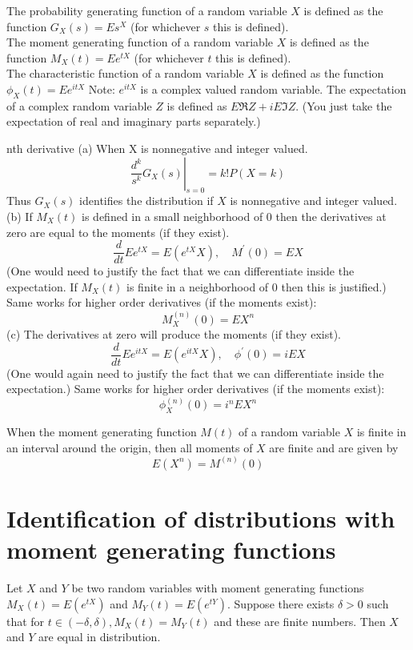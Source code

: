 \documentclass[11pt]{elegantbook}
\begin{document}
\begin{definition}
    The probability generating function of a random variable $X$ is defined as the function $G_X(s)=E s^X$ (for whichever $s$ this is defined).\\

The moment generating function of a random variable $X$ is defined as the function $M_X(t)=E e^{t X}$ (for whichever $t$ this is defined).\\

The characteristic function of a random variable $X$ is defined as the function $\phi_X(t)=E e^{i t X}$
Note: $e^{i t X}$ is a complex valued random variable. The expectation of a complex random variable $Z$ is defined as $E \Re Z+i E \Im Z$. (You just take the expectation of real and imaginary parts separately.)
\end{definition}
\begin{proposition}{nth derivative}
  (a) When X is nonnegative and integer valued.$$
\left.\frac{d^k}{s^k} G_X(s)\right|_{s=0}=k ! P(X=k)
$$
Thus $G_X(s)$ identifies the distribution if $X$ is nonnegative and integer valued.\\

(b)
If $M_X(t)$ is defined in a small neighborhood of 0 then the derivatives at zero are equal to the moments (if they exist).
$$
\frac{d}{d t} E e^{t X}=E\left(e^{t X} X\right), \quad M^{\prime}(0)=E X
$$
(One would need to justify the fact that we can differentiate inside the expectation. If $M_X(t)$ is finite in a neighborhood of 0 then this is justified.) Same works for higher order derivatives (if the moments exist):
$$
M_X^{(n)}(0)=E X^n
$$
(c)
The derivatives at zero will produce the moments (if they exist).
$$
\frac{d}{d t} E e^{i t X}=E\left(e^{i t X} X\right), \quad \phi^{\prime}(0)=i E X
$$
(One would again need to justify the fact that we can differentiate inside the expectation.) Same works for higher order derivatives (if the moments exist):
$$
\phi_X^{(n)}(0)=i^n E X^n
$$
\end{proposition}


\begin{theorem}
When the moment generating function $M(t)$ of a random variable $X$ is finite in an interval around the origin, then all moments of $X$ are finite and are given by
$$
E\left(X^n\right)=M^{(n)}(0)
$$
\end{theorem}

\section{Identification of distributions with moment generating functions}
\begin{theorem}
    Let $X$ and $Y$ be two random variables with moment generating functions $M_X(t)=E\left(e^{t X}\right)$ and $M_Y(t)=E\left(e^{t Y}\right)$. Suppose there exists $\delta>0$ such that for $t \in(-\delta, \delta), M_X(t)=M_Y(t)$ and these are finite numbers. Then $X$ and $Y$ are equal in distribution.
\end{theorem}
\end{document}
